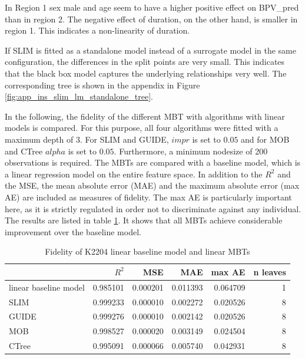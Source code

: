 In Region 1 sex male and age seem to have a higher positive effect on  BPV\_pred than in region 2. The negative effect of duration, on the other hand, is smaller in region 1. This indicates a non-linearity of duration.

If SLIM is fitted as a standalone model instead of a surrogate model in the same configuration, the differences in the split points are very small. This indicates that the black box model captures the underlying relationships very well. The corresponding tree is shown in the appendix in Figure \ref{fig:app_ins_slim_lm_standalone_tree}.

In the following, the fidelity of the different MBT with algorithms with linear models is compared. For this purpose, all four algorithms were fitted with a maximum depth of 3. For SLIM and GUIDE, $impr$ is set to $0.05$ and for MOB and CTree $alpha$ is set to $0.05$. Furthermore, a minimum nodesize of 200 observations is required.
The MBTs are compared with a baseline model, which is a linear regression model on the entire feature space. In addition to the $R^2$ and the MSE, the mean absolute error (MAE) and the maximum absolute error (max AE) are included as measures of fidelity. The max AE is particularly important here, as it is strictly regulated in order not to discriminate against any individual. 
The results are listed in table \ref{tab:ins_k2204_lm_surrogates_perf}. It shows that all MBTs achieve considerable improvement over the baseline model.

\begin{table}[!htb]

\centering \scriptsize
\begin{tabular}[t]{l|r|r|r|r|r}
\hline
  & $R^2$ & MSE & MAE & max AE & n leaves\\
\hline
linear baseline model & 0.985101 & 0.000201 & 0.011393 & 0.064709 & 1\\
\hline
SLIM & 0.999233 & 0.000010 & 0.002272 & 0.020526 & 8\\
GUIDE & 0.999276 & 0.000010 & 0.002142 & 0.020526 & 8\\
MOB & 0.998527 & 0.000020 & 0.003149 & 0.024504 & 8\\
CTree & 0.995091 & 0.000066 & 0.005740 & 0.042931 & 8\\
\hline
\end{tabular}
\label{tab:ins_k2204_lm_surrogates_perf}
\caption{Fidelity of K2204 linear baseline model and linear MBTs}
\end{table}

